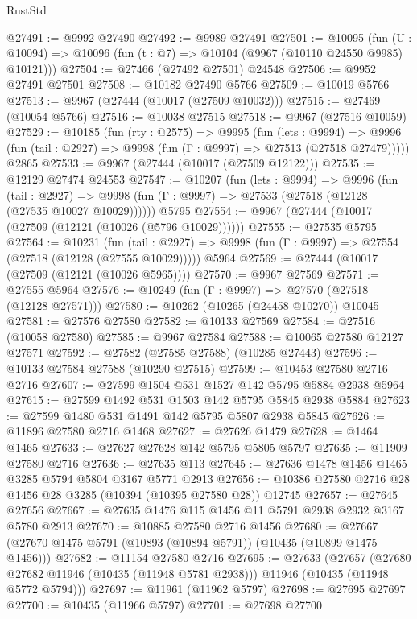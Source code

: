 \begin{lexlean}{RustStd}
\begin{coremodule}
@27491 := @9992 @27490
@27492 := @9989 @27491
@27501 := @10095
    (fun (U : @10094) => @10096 (fun (t : @7) => @10104 (@9967 (@10110 @24550 @9985) @10121)))
@27504 := @27466 (@27492 @27501) @24548
@27506 := @9952 @27491 @27501
@27508 := @10182 @27490 @5766
@27509 := @10019 @5766
@27513 := @9967 (@27444 (@10017 (@27509 @10032)))
@27515 := @27469 (@10054 @5766)
@27516 := @10038 @27515
@27518 := @9967 (@27516 @10059)
@27529 := @10185
    (fun (rty : @2575) =>
    @9995
      (fun (lets : @9994) =>
      @9996 (fun (tail : @2927) => @9998 (fun (Γ : @9997) => @27513 (@27518 @27479)))))
    @2865
@27533 := @9967 (@27444 (@10017 (@27509 @12122)))
@27535 := @12129 @27474 @24553
@27547 := @10207
    (fun (lets : @9994) =>
    @9996
      (fun (tail : @2927) =>
      @9998 (fun (Γ : @9997) => @27533 (@27518 (@12128 (@27535 @10027 @10029))))))
    @5795
@27554 := @9967 (@27444 (@10017 (@27509 (@12121 (@10026 (@5796 @10029))))))
@27555 := @27535 @5795
@27564 := @10231
    (fun (tail : @2927) => @9998 (fun (Γ : @9997) => @27554 (@27518 (@12128 (@27555 @10029)))))
    @5964
@27569 := @27444 (@10017 (@27509 (@12121 (@10026 @5965))))
@27570 := @9967 @27569
@27571 := @27555 @5964
@27576 := @10249 (fun (Γ : @9997) => @27570 (@27518 (@12128 @27571)))
@27580 := @10262 (@10265 (@24458 @10270)) @10045
@27581 := @27576 @27580
@27582 := @10133 @27569
@27584 := @27516 (@10058 @27580)
@27585 := @9967 @27584
@27588 := @10065 @27580 @12127 @27571
@27592 := @27582 (@27585 @27588) (@10285 @27443)
@27596 := @10133 @27584 @27588 (@10290 @27515)
@27599 := @10453 @27580 @2716 @2716
@27607 := @27599 @1504 @531 @1527 @142 @5795 @5884 @2938 @5964
@27615 := @27599 @1492 @531 @1503 @142 @5795 @5845 @2938 @5884
@27623 := @27599 @1480 @531 @1491 @142 @5795 @5807 @2938 @5845
@27626 := @11896 @27580 @2716 @1468
@27627 := @27626 @1479
@27628 := @1464 @1465
@27633 := @27627 @27628 @142 @5795 @5805 @5797
@27635 := @11909 @27580 @2716
@27636 := @27635 @113
@27645 := @27636 @1478 @1456 @1465 @3285 @5794 @5804 @3167 @5771 @2913
@27656 := @10386 @27580 @2716 @28 @1456 @28 @3285 (@10394 (@10395 @27580 @28)) @12745
@27657 := @27645 @27656
@27667 := @27635 @1476 @115 @1456 @11 @5791 @2938 @2932 @3167 @5780 @2913
@27670 := @10885 @27580 @2716 @1456
@27680 := @27667 (@27670 @1475 @5791 (@10893 (@10894 @5791)) (@10435 (@10899 @1475 @1456)))
@27682 := @11154 @27580 @2716
@27695 := @27633
    (@27657
      (@27680 @27682 @11946 (@10435 (@11948 @5781 @2938)))
      @11946
      (@10435 (@11948 @5772 @5794)))
@27697 := @11961 (@11962 @5797)
@27698 := @27695 @27697
@27700 := @10435 (@11966 @5797)
@27701 := @27698 @27700

\end{coremodule}
\end{lexlean}
